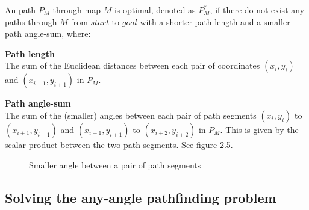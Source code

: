 \documentclass[12pt,notitlepage]{report}
\begin{document}
\noindent
An path $P_{M}$ through map $M$ is optimal, denoted as $P^{*}_{M}$, if there do not exist any paths through $M$ from $start$ to $goal$ with a shorter path length and a smaller path angle-sum, where:

\begin{description}
\item{\bfseries Path length}\\
The sum of the Euclidean distances between each pair of coordinates $(x_{i},y_{i})$ and $(x_{i+1},y_{i+1})$ in $P_{M}$.
\item{\bfseries Path angle-sum}\\
The sum of the (smaller) angles between each pair of path segments $(x_{i},y_{i})$ to $(x_{i+1},y_{i+1})$ and $(x_{i+1},y_{i+1})$ to $(x_{i+2},y_{i+2})$ in $P_{M}$. This is given by the scalar product between the two path segments. See figure 2.5.
\end{description}

\begin{figure}
   \centering
    \caption{Smaller angle between a pair of path segments}
  \end{figure}


\subsection{Solving the any-angle pathfinding problem}
\end{document}
